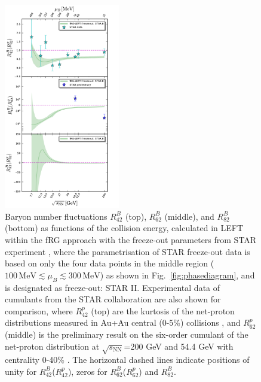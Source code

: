\documentclass[%
reprint,
superscriptaddress,
showpacs,preprintnumbers,
amsmath,amssymb,
aps,
prd,
]{revtex4-1}
\def\Fig#1{Fig.~\ref{#1}} \def\Tab#1{Tab.~\ref{#1}}
\begin{document}
%
\begin{figure}[t]
\includegraphics[width=0.45\textwidth]{Rm2-sqrtS2}
\caption{Baryon number fluctuations $R^{B}_{42}$ (top), $R^{B}_{62}$ (middle), and $R^{B}_{82}$ (bottom) as functions of the collision energy, calculated in LEFT within the fRG approach with the freeze-out parameters from STAR experiment \cite{Adamczyk:2017iwn}, where the parametrisation of STAR freeze-out data is based on only the four data points in the middle region ($100\,\mathrm{MeV}\lesssim\mu_B\lesssim 300\,\mathrm{MeV}$) as shown in \Fig{fig:phasediagram}, and is designated as freeze-out: STAR II. Experimental data of cumulants from the STAR collaboration are also shown for comparison, where $R^{p}_{42}$ (top) are the kurtosis of the net-proton distributions measured in Au+Au central (0-5\%) collisions \cite{Adam:2020unf}, and $R^{p}_{62}$ (middle) is the preliminary result on the six-order cumulant of the net-proton distribution at $\sqrt{s_{\mathrm{NN}}}$=200 GeV and 54.4 GeV with centrality 0-40\% \cite{Nonaka:2020crv,Pandav:2020uzx}. The horizontal dashed lines indicate positions of unity for $R^{B}_{42}$($R^{p}_{42}$), zeros for $R^{B}_{62}$($R^{p}_{62}$) and $R^{B}_{82}$.}\label{fig:Rm2-sqrtS2}\vspace{-0.5cm}
\end{figure}
%
\end{document}
